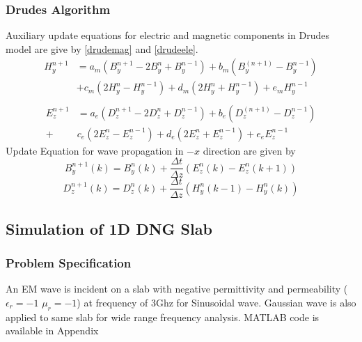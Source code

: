 
\subsubsection{Drudes Algorithm}
Auxiliary update equations for electric and magnetic components in Drudes model are give by \eqref{drudemag} and \eqref{drudeele}.
\begin{equation}
\begin{split}
	H_y^{n+1} &= a_m \left( B_y^{n+1} - 2B_y^n + B_y^{n-1} \right) + b_m \left( B_y^(n+1) - B_y^{n-1}  \right)\\
&+c_m \left( 2H_y^n-H_y^{n-1} \right) + d_m \left( 2H_y^n + H_y^{n-1} \right) +e_m H_y^{n-1}\\
\end{split}
\label{drudemag}
\end{equation}
\begin{equation}
\begin{split}
	E_z^{n+1} &= a_e \left( D_z^{n+1} - 2D_z^n + D_z^{n-1} \right) + b_e \left( D_z^(n+1) - D_z^{n-1}  \right)\\+ 
&c_e \left( 2E_z^n-E_z^{n-1} \right) + d_e \left( 2E_z^n + E_z^{n-1} \right) +e_e E_z^{n-1}
\label{drudeele}
\end{split}
\end{equation}
Update Equation for wave propagation in $-x$ direction are given by 
\begin{equation}
	B_y^{n+1}(k)=  B_y^{n} (k) + \frac {\Delta t}{\Delta z} \left( E_z^n (k) - E_z^n (k+1) \right)
\label{drudeby}
\end{equation}
\begin{equation}
	D_z^{n+1}(k)=  D_z^{n} (k) + \frac {\Delta t}{\Delta z} \left( H_y^n (k-1) - H_y^n (k) \right)
\label{drudedz}
\end{equation}

\subsection{Simulation of 1D DNG Slab}
\subsubsection{Problem Specification}
An EM wave is incident on a slab with negative permittivity and permeability ($\epsilon_r= -1$ $\mu_r= -1$) at frequency of 3Ghz for Sinusoidal wave. Gaussian wave is also applied to same slab for wide range frequency analysis. MATLAB code is available in 
Appendix %

